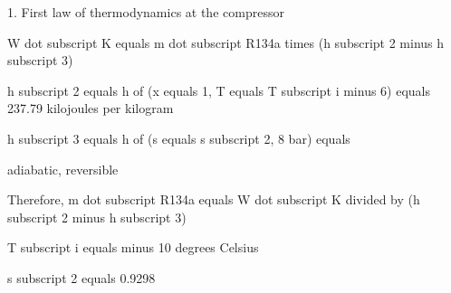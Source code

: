 1. First law of thermodynamics at the compressor

W dot subscript K equals m dot subscript R134a times (h subscript 2 minus h subscript 3)

h subscript 2 equals h of (x equals 1, T equals T subscript i minus 6) equals 237.79 kilojoules per kilogram

h subscript 3 equals h of (s equals s subscript 2, 8 bar) equals 

adiabatic, reversible

Therefore, m dot subscript R134a equals W dot subscript K divided by (h subscript 2 minus h subscript 3)

T subscript i equals minus 10 degrees Celsius

s subscript 2 equals 0.9298